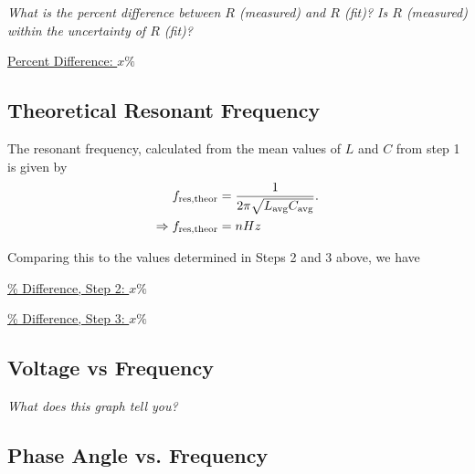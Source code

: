 \documentclass[twocolumn,english]{IEEEtran}
\theoremstyle{plain}
\theoremstyle{plain}
\begin{document}
\textit{What is the percent difference between $R$ (measured) and $R$ (fit)? Is $R$ (measured) within the uncertainty of $R$ (fit)?}

\underline{Percent Difference: $x\%$}

\hrulefill

\subsection{Theoretical Resonant Frequency}
The resonant frequency, calculated from the mean values of $L$ and $C$ from step 1 is given by
\begin{align}
	f_{\text{res,theor}} &= \frac{1}{2\pi\sqrt{L_{\text{avg}} C_{\text{avg}}}}. \\
	\Rightarrow f_{\text{res,theor}} &= n Hz \notag
\end{align}

Comparing this to the values determined in Steps 2 and 3 above, we have

\underline{\% Difference, Step 2: $x\%$}

\underline{\% Difference, Step 3: $x\%$}

\hrulefill

\subsection{Voltage vs Frequency}


\textit{What does this graph tell you?}

\hrulefill

\subsection{Phase Angle vs. Frequency}

\end{document}
